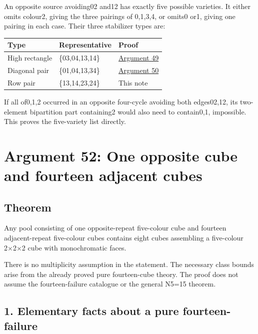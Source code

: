 \documentclass[
  10pt,
]{article}
\begin{document}
An opposite source avoiding02 and12 has exactly five possible varieties.
It either omits colour2, giving the three pairings of 0,1,3,4, or omits0
or1, giving one pairing in each case. Their three stabilizer types are:

\begin{longtable}[]{@{}lll@{}}
\toprule\noalign{}
Type & Representative & Proof \\
\midrule\noalign{}
\endhead
\bottomrule\noalign{}
\endlastfoot
High rectangle & \{03,04,13,14\} & \protect\hyperlink{arg-49}{Argument
49} \\
Diagonal pair & \{01,04,13,34\} & \protect\hyperlink{arg-50}{Argument
50} \\
Row pair & \{13,14,23,24\} & This note \\
\end{longtable}

If all of0,1,2 occurred in an opposite four-cycle avoiding both
edges02,12, its two-element bipartition part containing2 would also need
to contain0,1, impossible. This proves the five-variety list directly.

\hypertarget{arg-52}{%
\section{Argument 52: One opposite cube and fourteen adjacent
cubes}\label{arg-52}}

\hypertarget{theorem-4}{%
\subsection*{Theorem}\label{theorem-4}}

Any pool consisting of one opposite-repeat five-colour cube and fourteen
adjacent-repeat five-colour cubes contains eight cubes assembling a
five-colour 2×2×2 cube with monochromatic faces.

There is no multiplicity assumption in the statement. The necessary
class bounds arise from the already proved pure fourteen-cube theory.
The proof does not assume the fourteen-failure catalogue or the general
N5=15 theorem.

\hypertarget{elementary-facts-about-a-pure-fourteen-failure}{%
\subsection*{1. Elementary facts about a pure
fourteen-failure}\label{elementary-facts-about-a-pure-fourteen-failure}}
\end{document}
